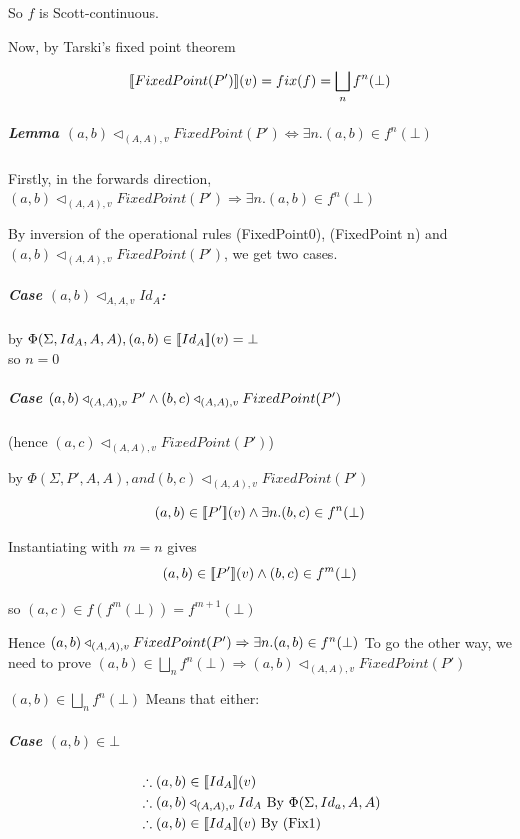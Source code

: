 \documentclass[12pt,a4paper,twoside,openright]{report}
\newcommand{\db}[1]{{\bf [\![}#1{\bf ]\!]}}
\newcommand{\deno}[1]{\db{#1}(v)}
\newcommand{\denoRule}[2]{#1 \in \deno{#2}}
\newcommand{\opRule}[3]{#1 \triangleleft_{#2, v} #3}
\newcommand{\phiRule}[3]{\Phi(\Sigma, #1, #2, #3)}
\begin{document}
\setlength{\leftskip}{0pt}
So $f$ is Scott-continuous.

Now, by Tarski's fixed point theorem

$$\deno{FixedPoint(P')} = fix(f) = \bigsqcup_nf^n(\bot)$$


\subparagraph{Lemma $\opRule{(a, b)}{(A, A)}{FixedPoint(P')} \Leftrightarrow \exists n. (a, b) \in f^n(\bot)$}

Firstly, in the forwards direction, $\opRule{(a, b)}{(A, A)}{FixedPoint(P')} \Rightarrow \exists n. (a, b) \in f^n(\bot)$

By inversion of the operational rules (FixedPoint0), (FixedPoint n) and $\opRule{(a, b)}{(A, A)}{FixedPoint(P')}$, we get two cases.



\subparagraph{Case $\opRule{(a,b)}{A, A}{Id_A}$:\\}
by $\phiRule{Id_A}{A}{A}, \denoRule{(a, b)}{Id_A} = \bot$\\so $n = 0$


\subparagraph{Case $\opRule{(a, b)}{(A,A)}{P'} \wedge \opRule{(b, c)}{(A,A)}{FixedPoint(P')}\\ $}
(hence $\opRule{(a, c)}{(A, A)}{FixedPoint(P')}$)

by $\phiRule{P'}{A}{A}, and \opRule{(b,c)}{(A,A)}{FixedPoint(P')}$

$$\denoRule{(a, b)}{P'} \wedge \exists n. (b, c) \in f^n(\bot)$$

Instantiating with $m = n$ gives
$$\denoRule{(a, b)}{P'} \wedge (b, c) \in f^m(\bot)$$

so $(a,c) \in f(f^m(\bot)) = f^{m+1}(\bot)$

Hence $\opRule{(a, b)}{(A, A)}{FixedPoint(P')} \Rightarrow \exists n. (a, b) \in f^n(\bot)\\\\ $
To go the other way, we need to prove $(a, b) \in \bigsqcup_nf^n(\bot) \Rightarrow \opRule{(a, b)}{(A, A)}{FixedPoint(P')}$

$(a, b) \in \bigsqcup_n f^n(\bot)$ Means that either:

\subparagraph{Case $(a, b) \in \bot$}
\begin{equation}
\label{Case Bottom}
\begin{split}
& \therefore \denoRule{(a,b)}{Id_A}\\
& \therefore \opRule{(a,b)}{(A, A)}{Id_A} \mbox{ By $\phiRule{Id_a}{A}{A}$}\\
& \therefore \denoRule{(a,b)}{Id_A} \mbox{ By (Fix1)}
\end{split}
\end{equation}
\end{document}
